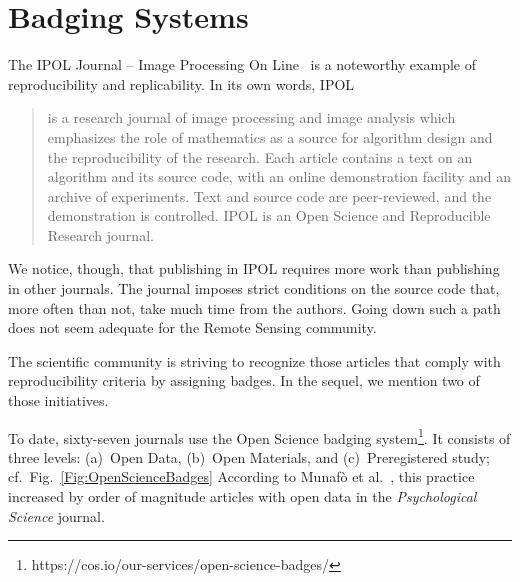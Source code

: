 \documentclass[journal,twoside]{IEEEtran}
\begin{document}
\section{Badging Systems}\label{Sec:BadgingSystems}

The IPOL Journal -- Image Processing On Line~\cite{IPOL} is a noteworthy example of reproducibility and replicability.
In its own words, IPOL
\begin{quote}
	is a research journal of image processing and image analysis which emphasizes the role of mathematics as a source for algorithm design and the reproducibility of the research. Each article contains a text on an algorithm and its source code, with an online demonstration facility and an archive of experiments. Text and source code are peer-reviewed, and the demonstration is controlled. IPOL is an Open Science and Reproducible Research journal.
\end{quote}

We notice, though, that publishing in IPOL requires more work than publishing in other journals. 
The journal imposes strict conditions on the source code that, more often than not, take much time from the authors.
Going down such a path does not seem adequate for the Remote Sensing community.

The scientific community is striving to recognize those articles that comply with reproducibility criteria by assigning badges.
In the sequel, we mention two of those initiatives.

To date, sixty-seven journals use the Open Science badging system\footnote{https://cos.io/our-services/open-science-badges/}.
It consists of three levels: (a)~Open Data, (b)~Open Materials, and (c)~Preregistered study; cf.\
Fig.~\ref{Fig:OpenScienceBadges}
According to Munaf\`o et al.~\cite{ManifestoReproducibleScience}, this practice increased by order of magnitude articles with open data in the \textit{Psychological Science} journal.
\end{document}
